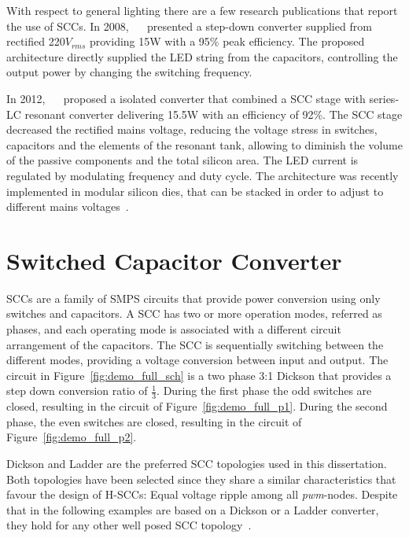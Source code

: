 With respect to general lighting there are a few research publications that report the use of SCCs. In 2008, ~\citeauthor{08Lee}~\cite{08Lee} presented a step-down converter supplied from rectified 220$V_{rms}$ providing 15W with a 95\% peak efficiency. The proposed architecture directly supplied the LED string from the capacitors, controlling the output power by changing the switching frequency.

In 2012, ~\citeauthor{2012Kline}~\cite{2012Kline} proposed a isolated converter that combined a SCC stage with series-LC resonant converter delivering 15.5W with an efficiency of  92\%.  The SCC stage decreased  the rectified mains voltage, reducing the voltage stress in switches, capacitors and the elements of the resonant tank, allowing to diminish  the volume of the passive components and the total silicon area. The LED current is regulated by modulating frequency and duty cycle.  The architecture was recently implemented in modular silicon dies, that can be stacked in order to adjust to different mains voltages~\cite{2013Kline}.



\section{Switched Capacitor Converter}

SCCs are a family of SMPS circuits that provide power conversion using only switches and capacitors. %
A SCC has two or more operation modes, referred as phases, and each operating mode is associated with a different circuit arrangement of the capacitors. The SCC is sequentially switching between the different modes, providing a voltage conversion between input and output. The circuit in Figure~\ref{fig:demo_full_sch} is a two phase 3:1 Dickson that provides a step down conversion ratio of $\frac{1}{3}$. During the first phase the odd switches are closed, resulting in the circuit of Figure~\ref{fig:demo_full_p1}. During the second phase, the even switches are closed, resulting in the circuit of Figure~\ref{fig:demo_full_p2}.

Dickson and Ladder are the preferred SCC topologies used in this dissertation. Both topologies have been selected since they share a similar characteristics that favour the design of H-SCCs: Equal voltage ripple among all \emph{pwm}-nodes. Despite that in the following examples are based on a Dickson or a Ladder  converter, they hold for any other well posed SCC topology~\cite{Seeman:EECS-2009-78}.

